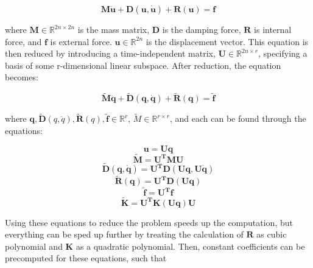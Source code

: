\documentclass[twocolumn,10pt]{asme2ej}
\begin{document}
\begin{equation}
\bm{M\ddot u} + \bm{D}(\bm{u}, \bm{\dot u}) + \bm{R}(\bm{u}) = \bm{f}
\label{eq_motion}
\end{equation}

\noindent where $\bm{M} \in \mathbb{R}^{2n \times 2n }$ is the mass matrix, $\bm{D}$ is the damping force, $\bm{R}$ is internal force, and $\bm{f}$ is external force. $\bm{u} \in \mathbb{R}^{2n}$ is the displacement vector. This equation is then reduced by introducing a time-independent matrix, $\bm{U} \in \mathbb{R}^{2n \times r}$, specifying a basis of some r-dimensional linear subspace. After reduction, the equation becomes:

\begin{equation}
\bm{\tilde{M}\ddot q} + \bm{\tilde{D}}(\bm{q}, \bm{\dot q}) + \bm{\tilde{R}}(\bm{q}) = \bm{\tilde{f}}
\label{eq_rmotion}
\end{equation}

\noindent where $\bm{q}, \bm{\tilde{D}}(q, \dot q), \bm{\tilde{R}}(q), \bm{\tilde{f}} \in \mathbb{R}^{r}$, $\tilde{M} \in \mathbb{R}^{r \times r}$, and each
can be found through the equations:

\begin{equation}
\bm{u} = \bm{Uq}
\label{eq_basisreduction}
\end{equation}
\begin{equation}
\bm{\tilde{M}} = \bm{U^{T}MU}
\label{eq_rmass}
\end{equation}
\begin{equation}
\bm{\tilde{D}}(\bm{q}, \bm{\dot q}) = \bm{U^{T}D}(\bm{Uq}, \bm{U \dot q})
\label{eq_rdamp}
\end{equation}
\begin{equation}
\bm{\tilde{R}}(\bm{q}) = \bm{U^{T}D}(\bm{Uq})
\label{eq_rinternal}
\end{equation}
\begin{equation}
\bm{\tilde{f}} = \bm{U^{T}f}
\label{eq_rexternal}
\end{equation}
\begin{equation}
\bm{\tilde{K}} = \bm{U^{T}K}(\bm{Uq})\bm{U}
\label{eq_rstiffness}
\end{equation}

Using these equations to reduce the problem speeds up the computation, but everything can be
sped up further by treating the calculation of $\bm{R}$ as cubic polynomial and $\bm{K}$ as a quadratic polynomial. Then,
constant coefficients can be precomputed for these equations, such that
\end{document}
